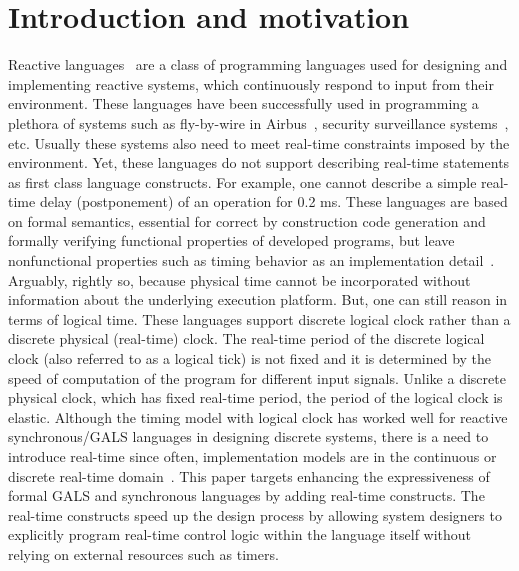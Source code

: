 \section{Introduction and motivation}
\label{sec:intr-motiv}

Reactive languages~\cite{gber931,amal10} are a class of programming
languages used for designing and implementing reactive systems, which
continuously respond to input from their environment. These languages
have been successfully used in programming a plethora of systems such as
fly-by-wire in Airbus~\cite{eairbus}, security surveillance
systems~\cite{amal121}, etc. Usually these systems also need to meet
real-time constraints imposed by the environment. Yet, these languages
do not support describing real-time statements as first class language
constructs.  For example, one cannot describe a simple real-time delay
(postponement) of an operation for 0.2 ms. These languages are based on
formal semantics, essential for correct by construction code generation
and formally verifying functional properties of developed programs, but
leave nonfunctional properties such as timing behavior as an
implementation detail~\cite{boldt07}. Arguably, rightly so, because
physical time cannot be incorporated without information about the
underlying execution platform.  But, one can still reason in terms of
logical time. These languages support discrete logical clock rather than
a discrete physical (real-time) clock. The real-time period of the
discrete logical clock (also referred to as a logical tick) is not fixed
and it is determined by the speed of computation of the program for
different input signals. Unlike a discrete physical clock, which has
fixed real-time period, the period of the logical clock is elastic.
Although the timing model with logical clock has worked well for
reactive synchronous/GALS languages in designing discrete systems, there
is a need to introduce real-time since often, implementation models are
in the continuous or discrete real-time
domain~\cite{DBLP:journals/pieee/SifakisTY03}. This paper targets
enhancing the expressiveness of formal GALS and synchronous languages by
adding real-time constructs. The real-time constructs speed up the
design process by allowing system designers to explicitly program
real-time control logic within the language itself without relying on
external resources such as timers.


